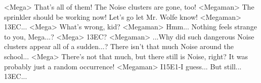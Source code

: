 <Mega> That's all of them! 
The Noise clusters are gone, too! 
<Megaman> The sprinkler should be working now! 
Let's go let Mr. Wolfe know! 
<Megaman> {13}{EC}... 
<Mega> What's wrong, kid? 
<Megaman> Hmm... 
Nothing feels strange to you, Mega...? 
<Mega> {13}{EC}? 
<Megaman> ...Why did such dangerous Noise clusters appear all of a sudden...? 
There isn't that much Noise around the school... 
<Mega> There's not that much, but there still is Noise, right? 
It was probably just a random occurrence! 
<Megaman> I{15}{E1}-I guess... 
But still... 
{13}{EC}... 
